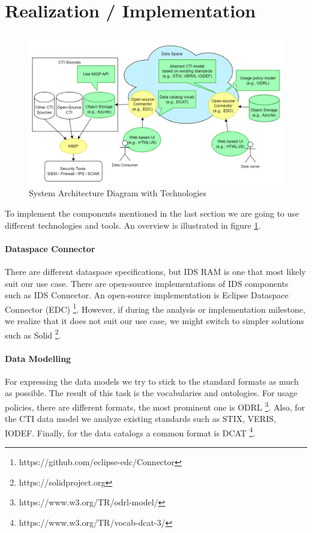 \documentclass{article}
\begin{document}
\section{Realization / Implementation} %
\label{sec:realization}


\begin{figure}[ht]
    \centering
    \includegraphics[width=\textwidth]{implementation.png}
    \caption{System Architecture Diagram with Technologies}
    \label{fig:implementation}
\end{figure}


To implement the components mentioned in the last section we are going to use different technologies and tools. An overview is illustrated in figure \ref{fig:implementation}.

\paragraph{Dataspace Connector}
There are different dataspace specifications, but IDS RAM is one that most likely suit our use case.
There are open-source implementations of IDS components such as IDS Connector. An open-source implementation is Eclipse Dataspace Connector (EDC) \footnote{https://github.com/eclipse-edc/Connector}. However, if during the analysis or implementation milestone, we realize that it does not suit our use case, we might switch to simpler solutions such as Solid \footnote{https://solidproject.org}.

\paragraph{Data Modelling}
For expressing the data models we try to stick to the standard formats as much as possible. The result of this task is the vocabularies and ontologies. For usage policies, there are different formats, the most prominent one is ODRL \footnote{https://www.w3.org/TR/odrl-model/}. Also, for the CTI data model we analyze existing standards such as STIX, VERIS, IODEF. Finally, for the data catalogs a common format is DCAT \footnote{https://www.w3.org/TR/vocab-dcat-3/}.
\end{document}
